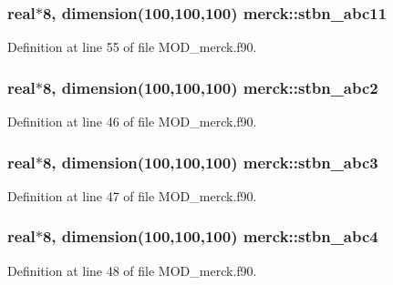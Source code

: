 \hypertarget{classmerck_ac5d13aa927a01400abfe91d6d6104f6c}{
\subsubsection[{stbn\-\_\-abc11}]{\setlength{\rightskip}{0pt plus 5cm}real$\ast$8, dimension(100,100,100) merck\-::stbn\-\_\-abc11}}\label{classmerck_ac5d13aa927a01400abfe91d6d6104f6c}


Definition at line 55 of file M\-O\-D\-\_\-merck.\-f90.

\hypertarget{classmerck_a78e5ceb735bb8919ea1340cde70d39fb}{
\subsubsection[{stbn\-\_\-abc2}]{\setlength{\rightskip}{0pt plus 5cm}real$\ast$8, dimension(100,100,100) merck\-::stbn\-\_\-abc2}}\label{classmerck_a78e5ceb735bb8919ea1340cde70d39fb}


Definition at line 46 of file M\-O\-D\-\_\-merck.\-f90.

\hypertarget{classmerck_aba98d0393b91fcf3e9afe92f053bd534}{
\subsubsection[{stbn\-\_\-abc3}]{\setlength{\rightskip}{0pt plus 5cm}real$\ast$8, dimension(100,100,100) merck\-::stbn\-\_\-abc3}}\label{classmerck_aba98d0393b91fcf3e9afe92f053bd534}


Definition at line 47 of file M\-O\-D\-\_\-merck.\-f90.

\hypertarget{classmerck_ad3d061d53e6814d08576d8984c9bcfc3}{
\subsubsection[{stbn\-\_\-abc4}]{\setlength{\rightskip}{0pt plus 5cm}real$\ast$8, dimension(100,100,100) merck\-::stbn\-\_\-abc4}}\label{classmerck_ad3d061d53e6814d08576d8984c9bcfc3}


Definition at line 48 of file M\-O\-D\-\_\-merck.\-f90.


